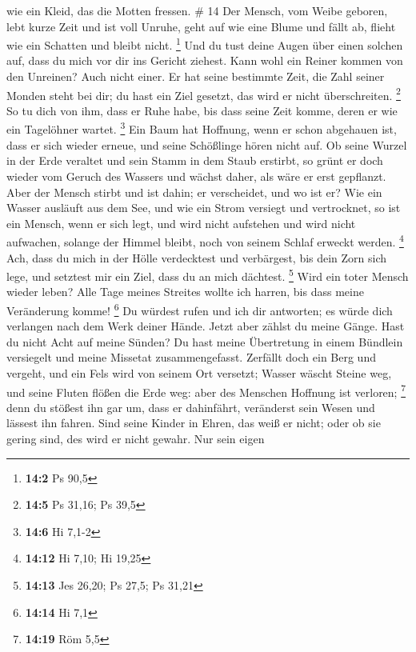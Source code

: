 wie ein Kleid, das die Motten fressen. \# 14  Der Mensch,
vom Weibe geboren, lebt kurze Zeit und ist voll Unruhe, 
geht auf wie eine Blume und fällt ab, flieht wie ein Schatten und bleibt
nicht. \footnote{\textbf{14:2} Ps 90,5}  Und du tust deine
Augen über einen solchen auf, dass du mich vor dir ins Gericht ziehest.
 Kann wohl ein Reiner kommen von den Unreinen? Auch nicht
einer.  Er hat seine bestimmte Zeit, die Zahl seiner Monden
steht bei dir; du hast ein Ziel gesetzt, das wird er nicht
überschreiten. \footnote{\textbf{14:5} Ps 31,16; Ps 39,5} 
So tu dich von ihm, dass er Ruhe habe, bis dass seine Zeit komme, deren
er wie ein Tagelöhner wartet. \footnote{\textbf{14:6} Hi 7,1-2}
 Ein Baum hat Hoffnung, wenn er schon abgehauen ist, dass er
sich wieder erneue, und seine Schößlinge hören nicht auf. 
Ob seine Wurzel in der Erde veraltet und sein Stamm in dem Staub
erstirbt,  so grünt er doch wieder vom Geruch des Wassers
und wächst daher, als wäre er erst gepflanzt.  Aber der
Mensch stirbt und ist dahin; er verscheidet, und wo ist er?
 Wie ein Wasser ausläuft aus dem See, und wie ein Strom
versiegt und vertrocknet,  so ist ein Mensch, wenn er sich
legt, und wird nicht aufstehen und wird nicht aufwachen, solange der
Himmel bleibt, noch von seinem Schlaf erweckt werden. \footnote{\textbf{14:12}
  Hi 7,10; Hi 19,25}  Ach, dass du mich in der Hölle
verdecktest und verbärgest, bis dein Zorn sich lege, und setztest mir
ein Ziel, dass du an mich dächtest. \footnote{\textbf{14:13} Jes 26,20;
  Ps 27,5; Ps 31,21}  Wird ein toter Mensch wieder leben?
Alle Tage meines Streites wollte ich harren, bis dass meine Veränderung
komme! \footnote{\textbf{14:14} Hi 7,1}  Du würdest rufen
und ich dir antworten; es würde dich verlangen nach dem Werk deiner
Hände.  Jetzt aber zählst du meine Gänge. Hast du nicht
Acht auf meine Sünden?  Du hast meine Übertretung in einem
Bündlein versiegelt und meine Missetat zusammengefasst. 
Zerfällt doch ein Berg und vergeht, und ein Fels wird von seinem Ort
versetzt;  Wasser wäscht Steine weg, und seine Fluten
flößen die Erde weg: aber des Menschen Hoffnung ist verloren;
\footnote{\textbf{14:19} Röm 5,5}  denn du stößest ihn gar
um, dass er dahinfährt, veränderst sein Wesen und lässest ihn fahren.
 Sind seine Kinder in Ehren, das weiß er nicht; oder ob sie
gering sind, des wird er nicht gewahr.  Nur sein eigen
